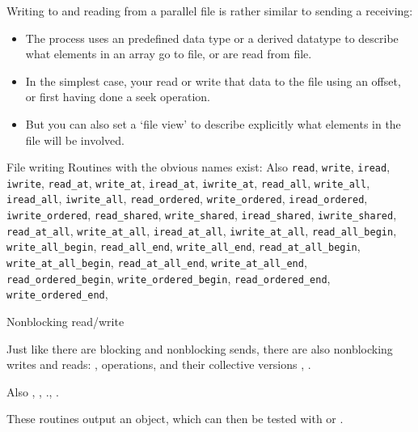 Writing to and reading from a parallel file is rather similar to
sending a receiving:
\begin{itemize}
\item The process uses an predefined data type or a derived datatype
  to describe what elements in an array go to file, or are read from
  file.
\item In the simplest case, your read or write that data to the file using an
  offset, or first having done a seek operation.
\item But you can also set a `file view' to describe explicitly what
  elements in the file will be involved.
\end{itemize}

\begin{mplnote}{File writing}
  Routines with the obvious names exist:
  Also
  \lstinline{read}, \lstinline{write},
  \lstinline{iread}, \lstinline{iwrite},
  \lstinline{read_at}, \lstinline{write_at},
  \lstinline{iread_at}, \lstinline{iwrite_at},
  \lstinline{read_all}, \lstinline{write_all},
  \lstinline{iread_all}, \lstinline{iwrite_all},
  \lstinline{read_ordered}, \lstinline{write_ordered},
  \lstinline{iread_ordered}, \lstinline{iwrite_ordered},
  \lstinline{read_shared}, \lstinline{write_shared},
  \lstinline{iread_shared}, \lstinline{iwrite_shared},
  \lstinline{read_at_all}, \lstinline{write_at_all},
  \lstinline{iread_at_all}, \lstinline{iwrite_at_all}, 
  \lstinline{read_all_begin}, \lstinline{write_all_begin},
  \lstinline{read_all_end}, \lstinline{write_all_end},
  \lstinline{read_at_all_begin}, \lstinline{write_at_all_begin},
  \lstinline{read_at_all_end}, \lstinline{write_at_all_end},
  \lstinline{read_ordered_begin}, \lstinline{write_ordered_begin},
  \lstinline{read_ordered_end}, \lstinline{write_ordered_end},
\end{mplnote}

 {Nonblocking read/write}

Just like there are blocking and nonblocking sends, there are also
nonblocking writes and reads:
,
operations,
and their collective versions
,
.

Also 
,
,
.,
.

These routines output an  object,
which can then be tested with
 or .

